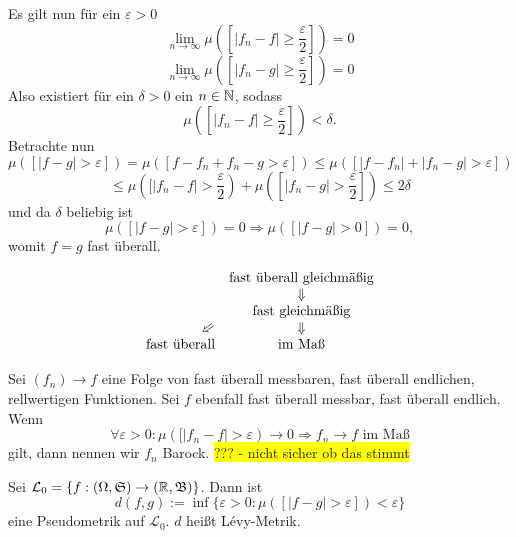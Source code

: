 			\begin{bew}
				Es gilt nun für ein $\varepsilon>0$
				\[ \lim_{n\to\infty} \mu([|f_n-f|\ge \frac{\varepsilon}{2}])=0 \]
				\[ \lim_{n\to\infty} \mu([|f_n-g|\ge \frac{\varepsilon}{2}])=0 \]
				Also existiert für ein $\delta>0$ ein $n\in\mathbb{N}$, sodass
				\[ \mu([|f_n-f|\ge\frac{\varepsilon}{2}])<\delta. \]
				Betrachte nun
				\[ \mu([|f-g|>\varepsilon])=\mu([f-f_n+f_n-g>\varepsilon])\le\mu([|f-f_n|+|f_n-g|>\varepsilon]) \]
				\[ \le \mu([|f_n-f|>\frac{\varepsilon}{2})+\mu([|f_n-g|>\frac{\varepsilon}{2}])\le 2\delta \]
				und da $\delta$ beliebig ist
				\[ \mu([|f-g|>\varepsilon])=0\Rightarrow\mu([|f-g|>0])=0, \]
				womit $f=g$ fast überall. 
			\end{bew}
			
			\begin{bem}
				\[
				\begin{array}{c c}
					&\text{fast überall gleichmäßig}\\
					&\Downarrow\\
					&\text{fast gleichmäßig}\\
					\hfill\schircherarrow&\Downarrow\\
					\text{fast überall}&\text{im Maß}
				\end{array}\]
			\end{bem}
			
			\begin{defi}
				Sei $(f_n)\to f$ eine Folge von fast überall messbaren, fast überall endlichen, rellwertigen Funktionen. Sei $f$ ebenfall fast überall messbar, fast überall endlich. Wenn 
				\[ \forall\varepsilon>0: \mu([|f_n-f|>\varepsilon)\to 0\Rightarrow f_n\to f\text{ im Maß} \]
				gilt, dann nennen wir $f_n$ Barock. \colorbox{yellow}{??? - nicht sicher ob das stimmt}
			\end{defi}
			
			\begin{lemma}
				Sei $\mathcal{L}_0=\{f:(\Omega,\mathfrak{S})\to(\mathbb{R},\mathfrak{B})\}$. Dann ist
				\[ d(f,g):=\inf\{\varepsilon>0: \mu([|f-g|>\varepsilon])<\varepsilon\} \]
				eine Pseudometrik auf $\mathcal{L}_0$. $d$ heißt Lévy-Metrik. 
			\end{lemma}
			

